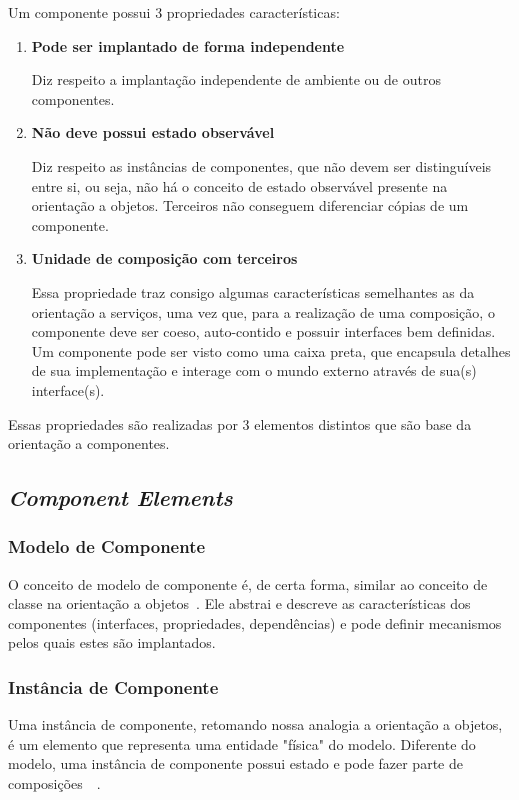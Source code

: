 Um componente possui 3 propriedades características:

\begin{enumerate}
\item \textbf{Pode ser implantado de forma independente}

Diz respeito a implantação independente de ambiente ou de outros componentes.

\item \textbf{Não deve possui estado observável}

Diz respeito as instâncias de componentes, que não devem ser distinguíveis entre si, ou seja, não há o conceito de estado observável presente na orientação a objetos. Terceiros não conseguem diferenciar cópias de um componente.

\item \textbf{Unidade de composição com terceiros}

Essa propriedade traz consigo algumas características semelhantes as da orientação a serviços, uma vez que, para a realização de uma composição, o componente deve ser coeso, auto-contido e possuir interfaces bem definidas. 
Um componente pode ser visto como uma caixa preta, que encapsula detalhes de sua implementação e interage com o mundo externo através de sua(s) interface(s).
\end{enumerate}

Essas propriedades são realizadas por 3 elementos distintos que são base da orientação a componentes.

\subsection{\textit{Component Elements}}
\label{sub:elements}

\subsubsection{Modelo de Componente}
O conceito de modelo de componente é, de certa forma, similar ao conceito de classe na orientação a objetos~\cite{cervantes2005technical}. Ele abstrai e descreve as características dos componentes (interfaces, propriedades, dependências) e pode definir mecanismos pelos quais estes são implantados.

\subsubsection{Instância de Componente}
Uma instância de componente, retomando nossa analogia a orientação a objetos, é um elemento que representa uma entidade "física" do modelo. Diferente do modelo, uma instância de componente possui estado e pode fazer parte de composições~\cite{cervantes2005technical}~\cite{szyperski2002component}.


